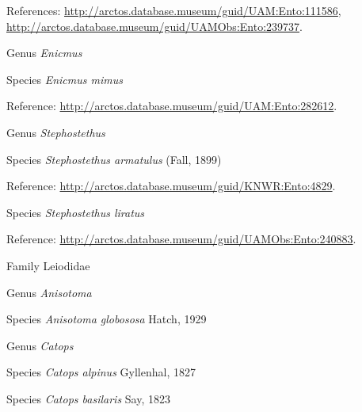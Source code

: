 \documentclass[9pt, article]{memoir}
\begin{document}
\begin{multicols}{2}
References: 
\url{http://arctos.database.museum/guid/UAM:Ento:111586}, 
\url{http://arctos.database.museum/guid/UAMObs:Ento:239737}.

\vspace{6pt}\noindent\hspace{30pt}Genus \textit{Enicmus}


\vspace{6pt}\noindent\hspace{36pt}Species \textit{Enicmus mimus}


Reference: 
\url{http://arctos.database.museum/guid/UAM:Ento:282612}.

\vspace{6pt}\noindent\hspace{30pt}Genus \textit{Stephostethus}


\vspace{6pt}\noindent\hspace{36pt}Species \textit{Stephostethus armatulus} (Fall, 1899)


Reference: 
\url{http://arctos.database.museum/guid/KNWR:Ento:4829}.

\vspace{6pt}\noindent\hspace{36pt}Species \textit{Stephostethus liratus}


Reference: 
\url{http://arctos.database.museum/guid/UAMObs:Ento:240883}.

\vspace{6pt}\noindent\hspace{24pt}Family Leiodidae


\vspace{6pt}\noindent\hspace{30pt}Genus \textit{Anisotoma}


\vspace{6pt}\noindent\hspace{36pt}Species \textit{Anisotoma globososa} Hatch, 1929


\vspace{6pt}\noindent\hspace{30pt}Genus \textit{Catops}


\vspace{6pt}\noindent\hspace{36pt}Species \textit{Catops alpinus} Gyllenhal, 1827


\vspace{6pt}\noindent\hspace{36pt}Species \textit{Catops basilaris} Say, 1823



\end{multicols}
\end{document}
